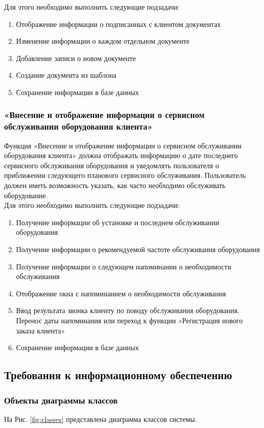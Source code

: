 \documentclass[a4paper,12pt]{article}
\begin{document}
Для этого необходимо выполнить следующие подзадачи:
\begin{enumerate}
    \item Отображение информации о подписанных с клиентом документах
    \item Изменение информации о каждом отдельном документе
    \item Добавление записи о новом документе
    \item Создание документа из шаблона
    \item Сохранение информации в базе данных
\end{enumerate}

\subsubsection{«Внесение и отображение информации о сервисном обслуживании оборудования клиента»}
Функция «Внесение и отображение информации о сервисном обслуживании оборудования клиента» должна отображать информацию о дате последнего сервисного обслуживания оборудования и уведомлять пользователя о приближении следующего планового сервисного обслуживания. Пользователь должен иметь возможность указать, как часто необходимо обслуживать оборудование.\\

Для этого необходимо выполнить следующие подзадачи:
\begin{enumerate}
    \item Получение информации об установке и последнем обслуживании оборудования
    \item Получение информации о рекомендуемой частоте обслуживания оборудования
    \item Получение информации о следующем напоминании о необходимости обслуживания
    \item Отображение окна с напоминанием о необходимости обслуживания
    \item Ввод результата звонка клиенту по поводу обслуживания оборудования. Перенос даты напоминания или переход к функции «Регистрация нового заказа клиента»
    \item Сохранение информации в базе данных
\end{enumerate}

\subsection{Требования к информационному обеспечению}
\subsubsection{Объекты диаграммы классов}
На Рис. \ref{fig:classes} представлена диаграмма классов системы.
\end{document}
